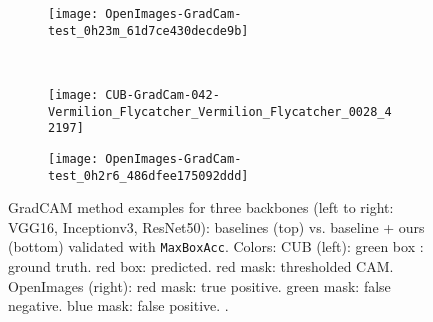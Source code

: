 \documentclass[twocolumn]{article}
\newcommand\maxboxacc{\texttt{MaxBoxAcc}\xspace}
\theoremstyle{definition}
\begin{document}
\begin{figure*}
\begin{subfigure}[b]{0.49\textwidth}
     \end{subfigure}
     \hfill
     \begin{subfigure}[b]{0.49\textwidth}
         \centering
         \texttt{[image: OpenImages-GradCam-test\_0h23m\_61d7ce430decde9b]}
     \end{subfigure}
     \\
     \vspace{0.1cm}
     \begin{subfigure}[b]{0.49\textwidth}
         \centering
         \texttt{[image: CUB-GradCam-042-Vermilion\_Flycatcher\_Vermilion\_Flycatcher\_0028\_42197]}
     \end{subfigure}
     \hfill
     \begin{subfigure}[b]{0.49\textwidth}
         \centering
         \texttt{[image: OpenImages-GradCam-test\_0h2r6\_486dfee175092ddd]}
     \end{subfigure}
        \caption{GradCAM method examples for three backbones (left to right: VGG16, Inceptionv3, ResNet50): baselines (top) vs. baseline + ours (bottom)  validated with \maxboxacc. Colors: CUB (left): green box : ground truth. red box: predicted. red mask: thresholded CAM. OpenImages (right): red mask: true positive. green mask: false negative. blue mask: false positive. .}
        \label{fig:gradcam-cub-openim-example-pred}
\end{figure*}
\end{document}
